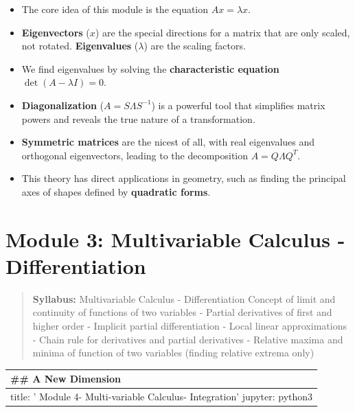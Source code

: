 \documentclass[
  letterpaper,
  DIV=11,
  numbers=noendperiod]{scrreprt}
\providecommand{\tightlist}{%
  \setlength{\itemsep}{0pt}\setlength{\parskip}{0pt}}
\begin{document}
\begin{itemize}
\tightlist
\item
  The core idea of this module is the equation \(Ax = \lambda x\).
\item
  \textbf{Eigenvectors} (\(x\)) are the special directions for a matrix
  that are only scaled, not rotated. \textbf{Eigenvalues} (\(\lambda\))
  are the scaling factors.
\item
  We find eigenvalues by solving the \textbf{characteristic equation}
  \(\det(A - \lambda I) = 0\).
\item
  \textbf{Diagonalization} (\(A = S \Lambda S^{-1}\)) is a powerful tool
  that simplifies matrix powers and reveals the true nature of a
  transformation.
\item
  \textbf{Symmetric matrices} are the nicest of all, with real
  eigenvalues and orthogonal eigenvectors, leading to the decomposition
  \(A = Q \Lambda Q^T\).
\item
  This theory has direct applications in geometry, such as finding the
  principal axes of shapes defined by \textbf{quadratic forms}.
\end{itemize}


\chapter{Module 3: Multivariable Calculus -
Differentiation}\label{module-3-multivariable-calculus---differentiation}

\begin{quote}
\textbf{Syllabus:} Multivariable Calculus - Differentiation Concept of
limit and continuity of functions of two variables - Partial derivatives
of first and higher order - Implicit partial differentiation - Local
linear approximations - Chain rule for derivatives and partial
derivatives - Relative maxima and minima of function of two variables
(finding relative extrema only)
\end{quote}

\begin{longtable}[]{@{}
  >{\raggedright\arraybackslash}p{}@{}}
\toprule\noalign{}
\begin{minipage}[b]{\linewidth}\raggedright
\#\# A New Dimension
\end{minipage} \\
\midrule\noalign{}
\endhead
\bottomrule\noalign{}
\endlastfoot
title: ' Module 4- Multi-variable Calculus- Integration' jupyter:
python3 \\
\end{longtable}
\end{document}
